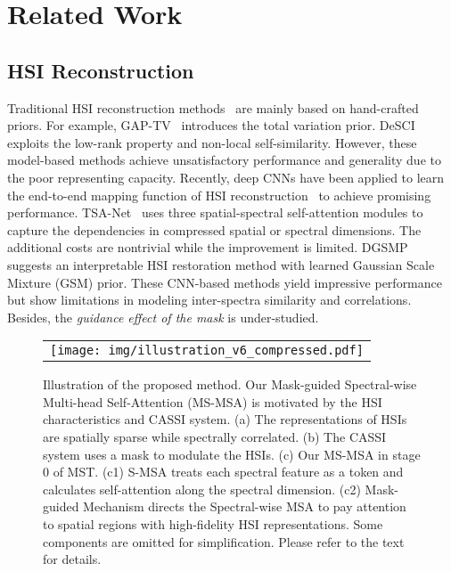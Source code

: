 \documentclass[10pt,twocolumn,letterpaper]{article}
\begin{document}
\section{Related Work}
\subsection{HSI Reconstruction}
Traditional HSI reconstruction  methods~\cite{sparse_1,sparse_2,sparse_3,desci,non_local_1,non_local_2,gap_tv,tra_rela_1,tra_rela_2} are mainly based on hand-crafted priors. For example, GAP-TV~\cite{gap_tv} introduces the total variation prior. DeSCI~\cite{desci} exploits the low-rank property and non-local self-similarity. However, these model-based methods achieve unsatisfactory performance and generality due to the poor representing capacity. Recently, deep CNNs have been applied to learn the end-to-end mapping function of HSI reconstruction~\cite{lambda,hssp,gsm,tsa_net,hdnet} to achieve promising performance. TSA-Net~\cite{tsa_net} uses three spatial-spectral self-attention modules to capture the dependencies in compressed spatial or spectral dimensions. The additional costs are nontrivial while the improvement is limited. DGSMP\cite{gsm} suggests an interpretable HSI restoration method with learned Gaussian Scale Mixture (GSM) prior. These CNN-based methods yield impressive performance but show limitations in modeling inter-spectra similarity and correlations. Besides, the \emph{guidance effect of the mask} is under-studied.

\begin{figure*}[t]
	\begin{center}
		\begin{tabular}[t]{c} \hspace{-3mm}
			\texttt{[image: img/illustration\_v6\_compressed.pdf]}
		\end{tabular}
	\end{center}
	\vspace*{-6mm}
	\caption{\small Illustration of the proposed method. Our Mask-guided Spectral-wise Multi-head Self-Attention (MS-MSA) is motivated by the HSI characteristics and CASSI system. (a) The representations of HSIs are spatially sparse while spectrally correlated. (b) The CASSI system uses a mask to modulate the HSIs. (c) Our MS-MSA in stage 0 of MST. (c1) S-MSA  treats each spectral feature as a token and calculates self-attention along the spectral dimension. (c2) Mask-guided Mechanism  directs the Spectral-wise MSA to pay attention to spatial regions with high-fidelity HSI representations. Some components are omitted for simplification. Please refer to the text for details.}
	\label{fig:illustration}
	\vspace{-4mm}
\end{figure*}
\end{document}
